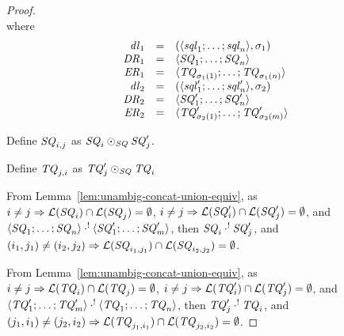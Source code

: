 \documentclass[numbers,10pt,preprint\ifanon ,nocopyrightspace\fi]{sigplanconf}
\begin{document}
\begin{proof}
\[{    }
  \]
  where
  \[
    \begin{array}{rcl}
      \mathit{dl}_1 & = &
                       (\langle\mathit{sql}_1;\ldots;\mathit{sql}_n\rangle,\sigma_1)\\
      \mathit{DR}_1 & = &
                        \langle\mathit{SQ}_1;\ldots;\mathit{SQ}_n\rangle\\
      \mathit{ER}_1 & = &
                           \langle\mathit{TQ}_{\sigma_1(1)};\ldots;\mathit{TQ}_{\sigma_1(n)}\rangle\\
      \mathit{dl}_2 & = &
                            (\langle\mathit{sql}_1';\ldots;\mathit{sql}_n'\rangle,\sigma_2)\\
      \mathit{DR}_2 & = &
                        \langle\mathit{SQ}_1';\ldots;\mathit{SQ}_n'\rangle\\
      \mathit{ER}_2 & = &
                           \langle\mathit{TQ}_{\sigma_2(1)}';\ldots;\mathit{TQ}_{\sigma_2(m)}'\rangle
    \end{array}
  \]
  
  Define $\mathit{SQ}_{i,j}$ as $\mathit{SQ}_i \odot_{\mathit{SQ}} \mathit{SQ}_j'$.

  Define $\mathit{TQ}_{j,i}$ as $\mathit{TQ}_j' \odot_{\mathit{SQ}}
  \mathit{TQ}_i$

  From Lemma~\ref{lem:unambig-concat-union-equiv}, as
  $i \neq j \Rightarrow \mathcal{L}(\mathit{SQ}_i) \cap
  \mathcal{L}(\mathit{SQ}_j) = \emptyset$,
  $i \neq j \Rightarrow \mathcal{L}(\mathit{SQ}_i') \cap
  \mathcal{L}(\mathit{SQ}_j') = \emptyset$,
  and
  $\langle\mathit{SQ}_1;\ldots;\mathit{SQ}_n\rangle \cdot^! \langle\mathit{SQ}_1';\ldots;\mathit{SQ}_m'\rangle$,
  then $\mathit{SQ}_i \cdot^! \mathit{SQ}_j'$,
  and $(i_1,j_1) \neq (i_2,j_2) \Rightarrow \mathcal{L}(\mathit{SQ}_{i_1,j_1})
  \cap \mathcal{L}(\mathit{SQ}_{i_2,j_2}) = \emptyset$.

  From Lemma~\ref{lem:unambig-concat-union-equiv}, as
  $i \neq j \Rightarrow \mathcal{L}(\mathit{TQ}_i) \cap
  \mathcal{L}(\mathit{TQ}_j) = \emptyset$,
  $i \neq j \Rightarrow \mathcal{L}(\mathit{TQ}_i') \cap
  \mathcal{L}(\mathit{TQ}_j') = \emptyset$,
  and
  $\langle\mathit{TQ}_1';\ldots;\mathit{TQ}_m'\rangle \cdot^! \langle\mathit{TQ}_1;\ldots;\mathit{TQ}_n\rangle$,
  then $\mathit{TQ}_j' \cdot^! \mathit{TQ}_i$,
  and $(j_1,i_1) \neq (j_2,i_2) \Rightarrow \mathcal{L}(\mathit{TQ}_{j_1,i_1})
  \cap \mathcal{L}(\mathit{TQ}_{j_2,i_2}) = \emptyset$.


\end{proof}
\end{document}
